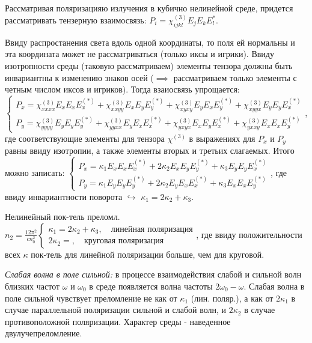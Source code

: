 

Рассматривая поляризацияю излучения в кубично нелинейной среде, придется рассматривать тензерную взаимосвязь: $P_{i}=\chi^{(3)}_{ijkl}E_{j}E_{k}E_{l}^{*}$.


Ввиду распростанения света вдоль одной координаты, то поля ей нормальны и эта координата может не рассматриваться (только иксы и игрики). Ввиду изотропности среды (таковую рассматриваем) элементы тензора должны быть инвариантны к изменению знаков осей ($\implies$ рассматриваем только элементы с четным числом иксов и игриков). Тогда взаиосвязь упрощается: $
\begin{cases}
    P_{x}=\chi_{xxxx}^{(3)}E_{x}E_{x}E_{x}^{(*)} + \chi_{xxyy}^{(3)}E_{x}E_{y}E_{y}^{(*)} + \chi_{xyxy}^{(3)}E_{y}E_{x}E_{y}^{(*)} + \chi_{xyyx}^{(3)}E_{y}E_{y}E_{x}^{(*)} \\
    P_{y}=\chi_{yyyy}^{(3)}E_{y}E_{y}E_{y}^{(*)} + \chi_{yyxx}^{(3)}E_{y}E_{x}E_{x}^{(*)} + \chi_{yxyx}^{(3)}E_{x}E_{y}E_{x}^{(*)} + \chi_{yxxy}^{(3)}E_{x}E_{x}E_{y}^{(*)}
\end{cases}$, где соответствующие элементы для тензора $\chi^{(3)}$ в выражениях для $P_{x}$ и $P_{y}$ равны ввиду изотропии, а также элементы вторых и третьих слагаемых. Итого можно записать: $
\begin{cases}
P_{x}=\kappa_{1}E_{x}E_{x}E_{x}^{(*)} + 2\kappa_{2}E_{x}E_{y}E_{y}^{(*)} + \kappa_{3}E_{y}E_{y}E_{x}^{(*)} \\
P_{y}=\kappa_{1}E_{y}E_{y}E_{y}^{(*)} + 2\kappa_{2}E_{y}E_{x}E_{x}^{(*)} + \kappa_{3}E_{x}E_{x}E_{y}^{(*)}
\end{cases}$, где ввиду инвариантности поворота $\hookrightarrow$ $\kappa_{1}=2\kappa_{2}+\kappa_{3}$.


Нелинейный пок-тель преломл. $n_{2}=\frac{12\pi^{2}}{cn_{0}^{2}} 
\begin{cases}
    \kappa_{1}=2\kappa_{2}+\kappa_{3}, \quad \text{линейная поляризация} \\
    2\kappa_{2}=, \quad \text{круговая поляризация}
\end{cases}$, где ввиду положительности всех $\kappa$ пок-тель для линейной поляризации больше, чем для круговой.


\textit{Слабая волна в поле сильной:} в процессе взаимодействия слабой и сильной волн близких частот $\omega$ и $\omega_{0}$ в среде появляется волна частоты $2\omega_{0}-\omega$. Слабая волна в поле сильной чувствует преломление не как от $\kappa_{1}$ (лин. поляр.), а как от $2\kappa_{1}$ в случае параллельной поляризации сильной и слабой волн, и $2\kappa_{2}$ в случае противоположной поляризации. Характер среды - наведенное двулучепреломление.

